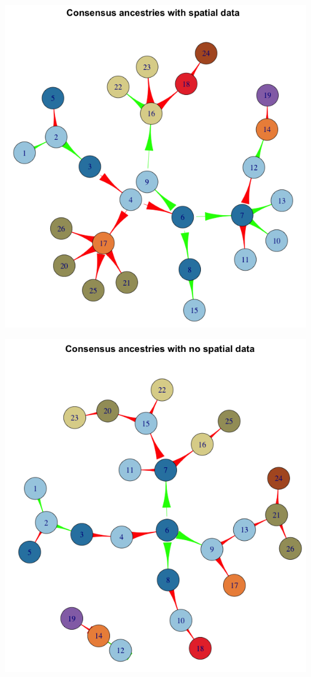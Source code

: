 \documentclass[11pt,a4paper]{report}
\begin{document}
\begin{center}
\includegraphics[scale=0.5]{tree_with_grps.png}
\end{center}
\begin{center}
\includegraphics[scale=0.5]{tree_no_grps.png}
\end{center}
\end{document}
